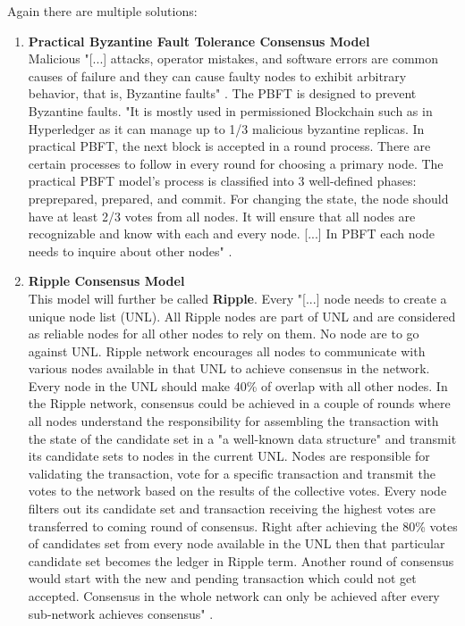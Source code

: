 Again there are multiple solutions:
\begin{enumerate}
	\item \textbf{Practical Byzantine Fault Tolerance Consensus Model} \label{sec:PracticalBFTCM} \\
	Malicious "[...] attacks, operator mistakes, and software errors are common causes of failure and
	they can cause faulty nodes to exhibit arbitrary behavior, that is, Byzantine faults" \cite[399]{Castro.2002}.
	The \gls{PBFT} is designed to prevent Byzantine faults.
	"It is mostly used in permissioned Blockchain such as in Hyperledger as it can manage up to 1/3 malicious byzantine replicas.
	In practical \gls{PBFT}, the next block is accepted in a round process.
	There are certain processes to follow in every round for choosing a primary node.
	The practical \gls{PBFT} model's process is classified into 3 well-defined phases: preprepared, prepared, and commit.
	For changing the state, the node should have at least 2/3 votes from all nodes.
	It will ensure that all nodes are recognizable and know with each and every node.
	[...] In \gls{PBFT} each node needs to inquire about other nodes"
	\cite[4]{Khan.2020}.
	\bigbreak
	
	\item \textbf{Ripple Consensus Model} \label{sec:RippleCM} \\
	This model will further be called \textbf{Ripple}.
	Every "[...] node needs to create a unique node list (UNL). All \gls{Ripple} nodes are part of UNL and are considered as reliable nodes for all other nodes to rely on them.
	No node are to go against UNL.
	\gls{Ripple} network encourages all nodes to communicate with various nodes available in that UNL to achieve consensus in the network.
	Every node in the UNL should make 40\% of overlap with all other nodes.
	In the \gls{Ripple} network, consensus could be achieved in a couple of rounds where all nodes understand the responsibility for assembling the transaction
	with the state of the candidate set in a "a well-known data structure" and transmit its candidate sets to nodes in the current UNL.
	Nodes are responsible for validating the transaction, vote for a specific transaction and transmit the votes to the network based on the results of the collective votes.
	Every node filters out its candidate set and transaction receiving the highest votes are transferred to coming round of consensus.
	Right after achieving the 80\% votes of candidates set from every node available in the UNL then that particular candidate set becomes the ledger in \gls{Ripple} term.
	Another round of consensus would start with the new and pending transaction which could not get accepted.
	Consensus in the whole network can only be achieved after every sub-network achieves consensus"
	\cite[4]{Khan.2020}.
	

\end{enumerate}
